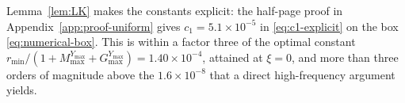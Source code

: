\begin{remark}\label{rem:coercivity}
Lemma~\ref{lem:LK} makes the constants explicit: the half-page proof in
Appendix~\ref{app:proof-uniform} gives $c_1=5.1\times10^{-5}$ in \eqref{eq:c1-explicit} on the box
\eqref{eq:numerical-box}.  This is within a factor three of the optimal constant
$r_{\min}/(1+M_{\max}^{Y_{\max}}+G_{\max}^{Y_{\max}})=1.40\times10^{-4}$, attained at $\xi=0$, and more
than three orders of magnitude above the $1.6\times10^{-8}$ that a direct high-frequency argument
yields.
\end{remark}
